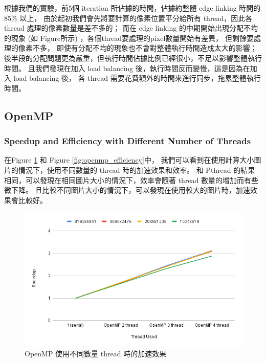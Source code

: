 \documentclass[sigconf,nonacm]{acmart}
\begin{document}
根據我們的實驗，前5個 iteration 所佔據的時間，佔據約整體 edge linking 時間的 85\% 以上，
由於起初我們會先將要計算的像素位置平分給所有 thread，因此各 thread 處理的像素數量是差不多的；
而在 edge linking 的中期開始出現分配不均的現象 (如 Figure所示) ，各個thread要處理的pixel數量開始有差異，
但剩餘要處理的像素不多，
即使有分配不均的現象也不會對整體執行時間造成太大的影響；
後半段的分配問題更為嚴重，但執行時間佔據比例已經很小，不足以影響整體執行時間。
且我們發現在加入 load balancing 後，執行時間反而變慢，這是因為在加入 load balancing 後，
各 thread 需要花費額外的時間來進行同步，拖累整體執行時間。

\subsection{OpenMP}

\subsubsection{Speedup and Efficiency with Different Number of Threads}

在Figure \ref{fig:openmp_speedup} 和 Figure \ref{fig:openmp_efficiency}中，
我們可以看到在使用計算大小圖片的情況下，使用不同數量的 thread 時的加速效果和效率。
和 Pthread 的結果相同，可以發現在相同圖片大小的情況下，效率會隨著 thread 數量的增加而有些微下降。
且比較不同圖片大小的情況下，可以發現在使用較大的圖片時，加速效果會比較好。

\begin{figure}[htbp]
  \centering
  \includegraphics[width=\linewidth]{"./image/openmp_speedup.png"}
  \caption{OpenMP 使用不同數量 thread 時的加速效果}
  \label{fig:openmp_speedup}
\end{figure}
\end{document}
